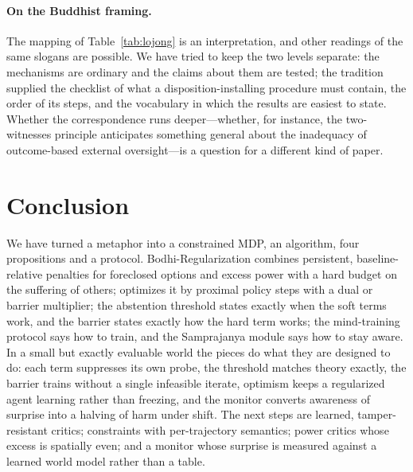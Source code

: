 \paragraph{On the Buddhist framing.}
The mapping of Table~\ref{tab:lojong} is an interpretation, and other readings of the same slogans are possible.
We have tried to keep the two levels separate: the mechanisms are ordinary and the claims about them are tested; the tradition supplied the checklist of what a disposition-installing procedure must contain, the order of its steps, and the vocabulary in which the results are easiest to state.
Whether the correspondence runs deeper---whether, for instance, the two-witnesses principle anticipates something general about the inadequacy of outcome-based external oversight---is a question for a different kind of paper.

\section{Conclusion}
We have turned a metaphor into a constrained MDP, an algorithm, four propositions and a protocol.
Bodhi-Regularization combines persistent, baseline-relative penalties for foreclosed options and excess power with a hard budget on the suffering of others; \BRAG{} optimizes it by proximal policy steps with a dual or barrier multiplier; the abstention threshold states exactly when the soft terms work, and the barrier states exactly how the hard term works; the mind-training protocol says how to train, and the Samprajanya module says how to stay aware.
In a small but exactly evaluable world the pieces do what they are designed to do: each term suppresses its own probe, the threshold matches theory exactly, the barrier trains without a single infeasible iterate, optimism keeps a regularized agent learning rather than freezing, and the monitor converts awareness of surprise into a halving of harm under shift.
The next steps are learned, tamper-resistant critics; constraints with per-trajectory semantics; power critics whose excess is spatially even; and a monitor whose surprise is measured against a learned world model rather than a table.
